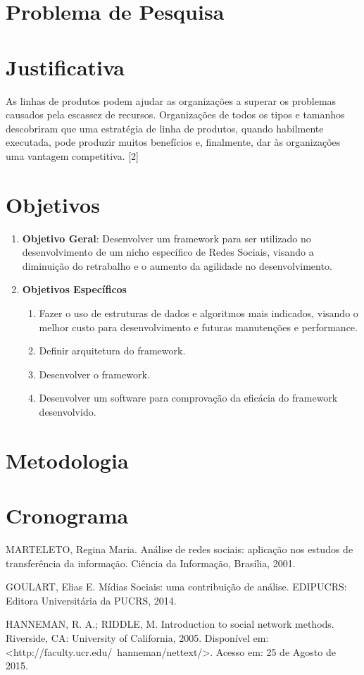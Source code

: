 \section*{Problema de Pesquisa}

\section*{Justificativa}

As linhas de produtos podem ajudar as organizações a superar os problemas causados pela escassez de recursos. Organizações de todos os tipos e tamanhos descobriram que uma estratégia de linha de produtos, quando habilmente executada, pode produzir muitos benefícios e, finalmente, dar às organizações uma vantagem competitiva. [2]

\section*{Objetivos}

\begin{enumerate}
	\item \textbf{Objetivo Geral}: Desenvolver um framework para ser utilizado no desenvolvimento de um nicho específico de Redes Sociais, visando a diminuição do retrabalho e o aumento da agilidade no desenvolvimento.

	\item \textbf{Objetivos Específicos}
	\begin{enumerate}
		\item Fazer o uso de estruturas de dados e algoritmos mais indicados, visando o melhor custo para desenvolvimento e futuras manutenções e performance.
		\item Definir arquitetura do framework.
		\item Desenvolver o framework.
		\item Desenvolver um software para comprovação da eficácia do framework desenvolvido.
	\end{enumerate}
\end{enumerate}

\section*{Metodologia}

\section*{Cronograma}

\postextual



MARTELETO, Regina Maria. Análise de redes sociais: aplicação nos estudos de transferência da informação. Ciência da Informação, Brasília, 2001.

GOULART, Elias E. Mídias Sociais: uma contribuição de análise. EDIPUCRS: Editora Universitária da PUCRS, 2014.

HANNEMAN, R. A.; RIDDLE, M. Introduction to social network methods. Riverside, CA: University of California, 2005. Disponível em: <http://faculty.ucr.edu/~hanneman/nettext/>. Acesso em: 25 de Agosto de 2015.

